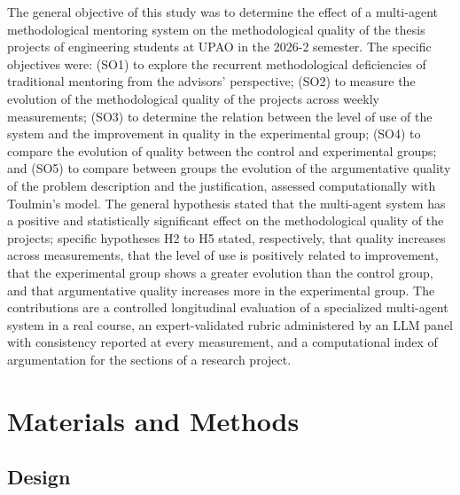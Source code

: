 \documentclass[journal]{IEEEtran}
\begin{document}
The general objective of this study was to determine the effect of a multi-agent methodological mentoring system on the methodological quality of the thesis projects of engineering students at UPAO in the 2026-2 semester. The specific objectives were: (SO1) to explore the recurrent methodological deficiencies of traditional mentoring from the advisors' perspective; (SO2) to measure the evolution of the methodological quality of the projects across weekly measurements; (SO3) to determine the relation between the level of use of the system and the improvement in quality in the experimental group; (SO4) to compare the evolution of quality between the control and experimental groups; and (SO5) to compare between groups the evolution of the argumentative quality of the problem description and the justification, assessed computationally with Toulmin's model. The general hypothesis stated that the multi-agent system has a positive and statistically significant effect on the methodological quality of the projects; specific hypotheses H2 to H5 stated, respectively, that quality increases across measurements, that the level of use is positively related to improvement, that the experimental group shows a greater evolution than the control group, and that argumentative quality increases more in the experimental group. The contributions are a controlled longitudinal evaluation of a specialized multi-agent system in a real course, an expert-validated rubric administered by an LLM panel with consistency reported at every measurement, and a computational index of argumentation for the sections of a research project.

\section{Materials and Methods}

\subsection{Design}
\end{document}
